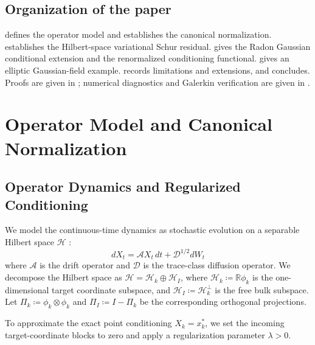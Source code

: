\documentclass[11pt]{amsart}
\theoremstyle{plain}
\theoremstyle{definition}
\theoremstyle{remark}
\begin{document}
\subsection{Organization of the paper}
\label{sec:organization}

 defines the operator model and establishes the canonical normalization.  establishes the Hilbert-space variational Schur residual.  gives the Radon Gaussian conditional extension and the renormalized conditioning functional.  gives an elliptic Gaussian-field example.  records limitations and extensions, and  concludes. Proofs are given in ; numerical diagnostics and Galerkin verification are given in .

\section{Operator Model and Canonical Normalization}
\label{sec:setup}

\subsection{Operator Dynamics and Regularized Conditioning}
\label{sec:setup:dynamics}

We model the continuous-time dynamics as stochastic evolution on a separable Hilbert space $\mathcal{H}$ \cite{daprato2014stochastic}:
\begin{equation}
  \label{eq:stochastic_evolution}
  dX_t = \mathcal{A} X_t \, dt + \mathcal{D}^{1/2} dW_t
\end{equation}
where $\mathcal{A}$ is the drift operator and $\mathcal{D}$ is the trace-class diffusion operator. We decompose the Hilbert space as $\mathcal{H} = \mathcal{H}_k \oplus \mathcal{H}_I$, where $\mathcal{H}_k \coloneqq \mathbb{R}\phi_k$ is the one-dimensional target coordinate subspace, and $\mathcal{H}_I \coloneqq \mathcal{H}_k^\perp$ is the free bulk subspace. Let $\Pi_k \coloneqq \phi_k \otimes \phi_k$ and $\Pi_I \coloneqq I - \Pi_k$ be the corresponding orthogonal projections.

To approximate the exact point conditioning $X_k = x_k^*$, we set the incoming target-coordinate blocks to zero and apply a regularization parameter $\lambda > 0$.
\end{document}

